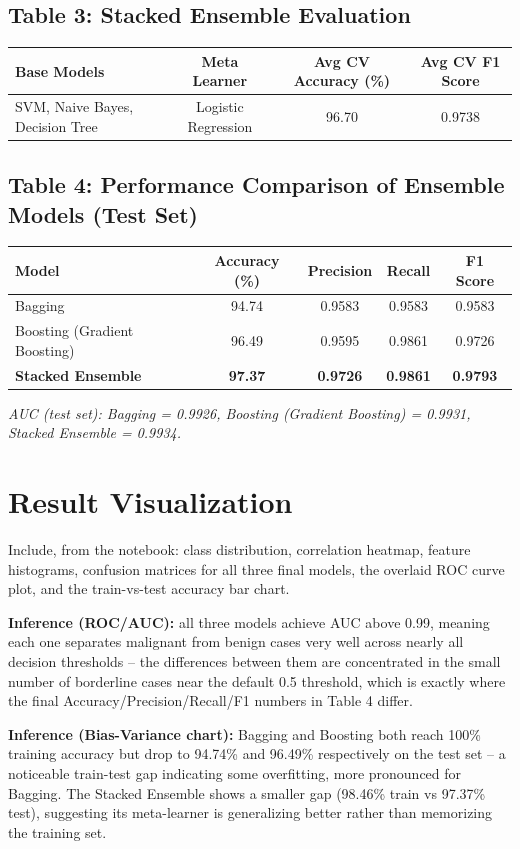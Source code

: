 \documentclass[12pt,a4paper]{article}
\begin{document}
\subsection*{Table 3: Stacked Ensemble Evaluation}
\begin{longtable}{lccc}
\toprule
Base Models & Meta Learner & Avg CV Accuracy (\%) & Avg CV F1 Score\\
\midrule
SVM, Naive Bayes, Decision Tree & Logistic Regression & 96.70 & 0.9738 \\
\bottomrule
\end{longtable}

\subsection*{Table 4: Performance Comparison of Ensemble Models (Test Set)}
\begin{longtable}{lcccc}
\toprule
Model & Accuracy (\%) & Precision & Recall & F1 Score\\
\midrule
Bagging & 94.74 & 0.9583 & 0.9583 & 0.9583 \\
Boosting (Gradient Boosting) & 96.49 & 0.9595 & 0.9861 & 0.9726 \\
\textbf{Stacked Ensemble} & \textbf{97.37} & \textbf{0.9726} & \textbf{0.9861} & \textbf{0.9793} \\
\bottomrule
\end{longtable}

\textit{AUC (test set): Bagging = 0.9926, Boosting (Gradient Boosting) = 0.9931,
Stacked Ensemble = 0.9934.}

\section{Result Visualization}

Include, from the notebook: class distribution, correlation heatmap, feature
histograms, confusion matrices for all three final models, the overlaid ROC curve
plot, and the train-vs-test accuracy bar chart.

\textbf{Inference (ROC/AUC):} all three models achieve AUC above 0.99, meaning each
one separates malignant from benign cases very well across nearly all decision
thresholds -- the differences between them are concentrated in the small number of
borderline cases near the default 0.5 threshold, which is exactly where the final
Accuracy/Precision/Recall/F1 numbers in Table 4 differ.

\textbf{Inference (Bias-Variance chart):} Bagging and Boosting both reach 100\%
training accuracy but drop to 94.74\% and 96.49\% respectively on the test set --
a noticeable train-test gap indicating some overfitting, more pronounced for
Bagging. The Stacked Ensemble shows a smaller gap (98.46\% train vs 97.37\% test),
suggesting its meta-learner is generalizing better rather than memorizing the
training set.
\end{document}

